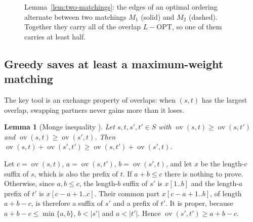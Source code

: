 \documentclass[11pt,a4paper]{article}   %
\makeatletter
\renewenvironment{proof}[1][\proofname]{\par
  \pushQED{\qed}%
  \normalfont \topsep1\p@\@plus1\p@\relax
  \trivlist
  \item[\hskip\labelsep\itshape #1\@addpunct{.}]\ignorespaces
}{\popQED\endtrivlist\@endpefalse}
\theoremstyle{compact}
\newtheorem{lemma}[theorem]{Lemma}
\theoremstyle{compactdef}
\newcommand{\OPT}{\mathrm{OPT}}
\newcommand{\ov}{\operatorname{ov}}         %
\makeatother
\begin{document}
\begin{figure}[htb]\centering
{}
\caption{Lemma~\ref{lem:two-matchings}: the edges of an optimal ordering
alternate between two matchings $M_1$ (solid) and $M_2$ (dashed). Together
they carry all of the overlap $L-\OPT$, so one of them carries at least
half.}\label{fig:two-matchings}
\end{figure}
 
\subsection{Greedy saves at least a maximum-weight matching}
 
The key tool is an exchange property of overlaps: when $(s,t)$ has the
largest overlap, swapping partners never gains more than it loses.
 
\begin{lemma}[Monge inequality {\cite[Lemma~3.1]{TU88}}]\label{lem:monge}
Let $s,t,s',t'\in S$ with $\ov(s,t)\ge\ov(s,t')$ and
$\ov(s,t)\ge\ov(s',t)$. Then $\ov(s,t)+\ov(s',t')\ge\ov(s,t')+\ov(s',t)$.
\end{lemma}
 
\begin{proof}
Let $c=\ov(s,t)$, $a=\ov(s,t')$, $b=\ov(s',t)$, and let $x$ be the
length-$c$ suffix of $s$, which is also the prefix of $t$. If $a+b\le c$
there is nothing to prove. Otherwise, since $a,b\le c$, the length-$b$
suffix of $s'$ is $x[1..b]$ and the length-$a$ prefix of $t'$ is
$x[c-a+1..c]$. Their common part $x[c-a+1..b]$, of length $a+b-c$, is
therefore a suffix of $s'$ and a prefix of $t'$. It is proper, because
$a+b-c\le\min\{a,b\}$, $b<|s'|$ and $a<|t'|$. Hence $\ov(s',t')\ge a+b-c$.
\end{proof}
\end{document}
